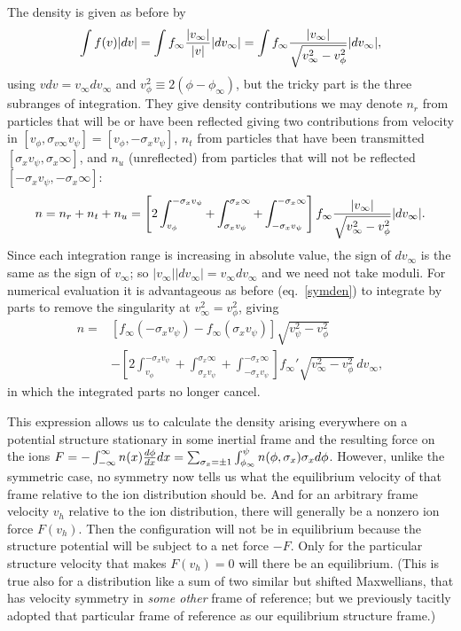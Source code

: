 \documentclass[pre]{revtex4-2}
\begin{document}
The density is given as before by 
\begin{equation}
\int f(v) |dv|=\int f_\infty {|v_\infty|\over |v|}   |dv_\infty| 
=\int  f_\infty {|v_\infty|\over \sqrt{v_\infty^2-v_\phi^2} }  |dv_\infty|, 
\end{equation}
using $vdv=v_\infty dv_\infty$ and
$v_\phi^2\equiv 2(\phi-\phi_\infty)$, but the tricky part is the three
subranges of integration. They give density contributions we may
denote $n_r$ from particles that will be or have been reflected giving two
contributions from
velocity in $[v_\phi,\sigma_{v\infty} v_\psi]=[v_\phi,-\sigma_x v_\psi]$, $n_t$ from particles that have been
transmitted $[\sigma_xv_\psi,\sigma_x\infty]$, and $n_u$ (unreflected)
from particles that will not be reflected
$[-\sigma_xv_\psi,-\sigma_x\infty]$:
\begin{equation}
  n=n_r+n_t+n_u=\left[2\int_{v_\phi}^{-\sigma_x v_\psi}+\int_{\sigma_x v_\psi}^{\sigma_x\infty}
    +\int_{-\sigma_x v_\psi}^{-\sigma_x\infty}\right] 
  f_\infty {|v_\infty|\over \sqrt{v_\infty^2-v_\phi^2} }  |dv_\infty|.
\end{equation}
Since each integration range is increasing in absolute value, the sign
of $dv_\infty$ is the same as the sign of $v_\infty$; so
$|v_\infty||dv_\infty|= v_\infty dv_\infty$ and we need not take moduli.
For numerical evaluation it is advantageous as before (eq.\
\ref{symden}) to integrate by parts to
remove the singularity at $v_\infty^2=v_\phi^2$, giving 
\begin{equation}
\begin{split}
  n=&[f_\infty(-\sigma_xv_\psi)-f_\infty(\sigma_xv_\psi)]\sqrt{v_\psi^2-v_\phi^2}\\
  &-\left[2\int_{v_\phi}^{-\sigma_x v_\psi}+\int_{\sigma_x v_\psi}^{\sigma_x\infty}
    +\int_{-\sigma_x v_\psi}^{-\sigma_x\infty}\right]
  f_\infty'\sqrt{v_\infty^2-v_\phi^2}\, dv_\infty,
\end{split}
\end{equation}
in which the integrated parts no longer cancel.

This expression allows us to calculate the density arising everywhere
on a potential structure stationary in some inertial frame and the
resulting force on the ions
$F=-\int_{-\infty}^{\infty} n(x) {d\phi\over dx}dx= \sum_{\sigma_x=\pm1} 
\int_{\phi_\infty}^\psi n(\phi,\sigma_x) \sigma_x d\phi$. However, unlike
the symmetric case, no symmetry now tells us what the equilibrium
velocity of that frame relative to the ion distribution should be. And
for an arbitrary frame velocity $v_h$ relative to the ion
distribution, there will generally be a nonzero ion force
$F(v_h)$. Then the configuration will not be in equilibrium because
the structure potential will be subject to a net force $-F$. Only for
the particular structure velocity that makes $F(v_h)=0$ will there be
an equilibrium.  (This is true also for a distribution like a sum of
two similar but shifted Maxwellians, that has velocity symmetry in
\emph{some other} frame of reference; but we previously tacitly
adopted that particular frame of reference as our equilibrium
structure frame.)
\end{document}

